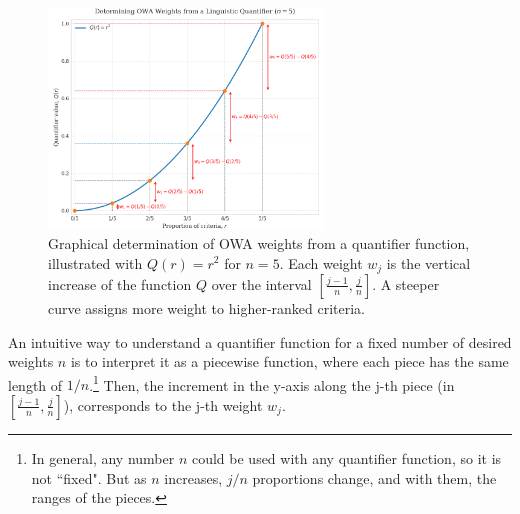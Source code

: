\begin{figure}[!ht]
    \centering
    \includegraphics[width=0.65\textwidth]{ch2/figures/linguistic_quantifier_weights.png}
    \caption{Graphical determination of OWA weights from a quantifier function, illustrated with $Q(r) = r^2$ for $n=5$. Each weight $w_j$ is the vertical increase of the function $Q$ over the interval $[\frac{j-1}{n}, \frac{j}{n}]$. A steeper curve assigns more weight to higher-ranked criteria.}
    \label{fig:quantifier_weights}
\end{figure}

An intuitive way to understand a quantifier function for a fixed number of desired weights $n$ is to interpret it as a piecewise function, where each piece has the same length of $1/n$.\footnote{In general, any number $n$ could be used with any quantifier function, so it is not ``fixed". But as $n$ increases, $j/n$ proportions change, and with them, the ranges of the pieces.} Then, the increment in the y-axis along the j-th piece (in $[\frac{j-1}{n}, \frac{j}{n}]$), corresponds to the j-th weight $w_j$. \\


